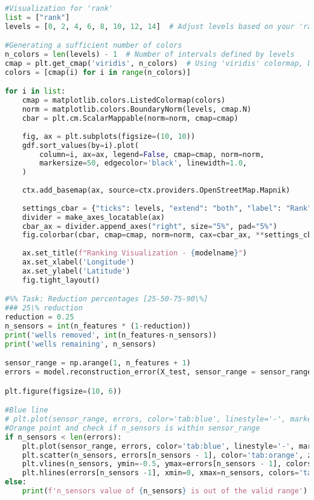 \begin{lstlisting}[language=Python]
#Visualization for 'rank'
list = ["rank"]
levels = [0, 2, 4, 6, 8, 10, 12, 14]  # Adjust levels based on your 'rank' data specifics

#Generating a sufficient number of colors
n_colors = len(levels) - 1  # Number of intervals defined by levels
cmap = plt.get_cmap('viridis', n_colors)  # Using 'viridis' colormap, but you can choose another
colors = [cmap(i) for i in range(n_colors)]

for i in list:
    cmap = matplotlib.colors.ListedColormap(colors)
    norm = matplotlib.colors.BoundaryNorm(levels, cmap.N)
    cbar = plt.cm.ScalarMappable(norm=norm, cmap=cmap)
    
    fig, ax = plt.subplots(figsize=(10, 10))
    gdf.sort_values(by=i).plot(
        column=i, ax=ax, legend=False, cmap=cmap, norm=norm,
        markersize=50, edgecolor='black', linewidth=1.0,
    )
    
    ctx.add_basemap(ax, source=ctx.providers.OpenStreetMap.Mapnik)
    
    settings_cbar = {"ticks": levels, "extend": "both", "label": "Rank"}
    divider = make_axes_locatable(ax)
    cbar_ax = divider.append_axes("right", size="5%", pad="5%")
    fig.colorbar(cbar, cmap=cmap, norm=norm, cax=cbar_ax, **settings_cbar)
    
    ax.set_title(f"Ranking Visualization - {modelname}")
    ax.set_xlabel('Longitude')
    ax.set_ylabel('Latitude')
    fig.tight_layout()

#%% Task: Reduction percentages [25-50-75-90\%]
### 25\% reduction
reduction = 0.25
n_sensors = int(n_features * (1-reduction))
print('wells removed', int(n_features-n_sensors))
print('wells remaining', n_sensors)

sensor_range = np.arange(1, n_features + 1)
errors = model.reconstruction_error(X_test, sensor_range = sensor_range)

plt.figure(figsize=(10, 6))

#Blue line 
# plt.plot(sensor_range, errors, color='tab:blue', linestyle='-', marker='')
#Orange point and check if n_sensors is within sensor_range
if n_sensors < len(errors):
    plt.plot(sensor_range, errors, color='tab:blue', linestyle='-', marker='')
    plt.scatter(n_sensors, errors[n_sensors - 1], color='tab:orange', zorder=5)
    plt.vlines(n_sensors, ymin=-0.5, ymax=errors[n_sensors - 1], colors='tab:orange', linestyle='--', linewidth=2.0, label='Selected number of wells')
    plt.hlines(errors[n_sensors -1], xmin=0, xmax=n_sensors, colors='tab:orange', linestyle='--', linewidth=2.0)
else: 
    print(f'n_sensors value of {n_sensors} is out of the valid range')
    

\end{lstlisting}
